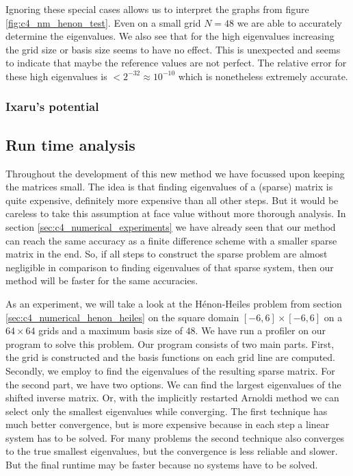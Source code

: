 Ignoring these special cases allows us to interpret the graphs from figure \ref{fig:c4_nm_henon_test}. Even on a small grid $N = 48$ we are able to accurately determine the eigenvalues. We also see that for the high eigenvalues increasing the grid size or basis size seems to have no effect. This is unexpected and seems to indicate that maybe the reference values are not perfect. The relative error for these high eigenvalues is $< 2^{-32} \approx 10^{-10}$ which is nonetheless extremely accurate.

\subsubsection{Ixaru's potential}\label{sec:c4_numerical_ixaru}


\subsection{Run time analysis}\label{sec:c4_nm_runtime}

Throughout the development of this new method we have focussed upon keeping the matrices small. The idea is that finding eigenvalues of a (sparse) matrix is quite expensive, definitely more expensive than all other steps. But it would be careless to take this assumption at face value without more thorough analysis. In section \ref{sec:c4_numerical_experiments} we have already seen that our method can reach the same accuracy as a finite difference scheme with a smaller sparse matrix in the end. So, if all steps to construct the sparse problem are almost negligible in comparison to finding eigenvalues of that sparse system, then our method will be faster for the same accuracies.

As an experiment, we will take a look at the Hénon-Heiles problem from section \ref{sec:c4_numerical_henon_heiles} on the square domain $[-6 , 6]\times [-6, 6]$ on a $64\times 64$ grids and a maximum basis size of $48$. We have run a profiler on our program to solve this problem. Our program consists of two main parts. First, the grid is constructed and the basis functions on each grid line are computed. Secondly, we employ \spectra{} to find the eigenvalues of the resulting sparse matrix. For the second part, we have two options. We can find the largest eigenvalues of the shifted inverse matrix. Or, with the implicitly restarted Arnoldi method we can select only the smallest eigenvalues while converging. The first technique has much better convergence, but is more expensive because in each step a linear system has to be solved. For many problems the second technique also converges to the true smallest eigenvalues, but the convergence is less reliable and slower. But the final runtime may be faster because no systems have to be solved.


